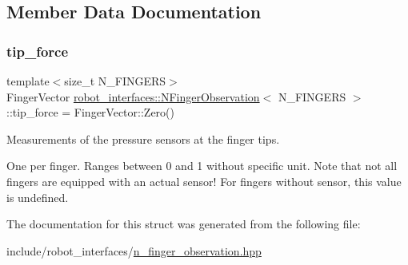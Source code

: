 \subsection{Member Data Documentation}
\mbox{\label{structrobot__interfaces_1_1NFingerObservation_a48ea78dfbc3e17a313a312d758d27343}} 
\subsubsection{\texorpdfstring{tip\+\_\+force}{tip\_force}}
{\footnotesize\ttfamily template$<$size\+\_\+t N\+\_\+\+F\+I\+N\+G\+E\+RS$>$ \\
Finger\+Vector \hyperlink{structrobot__interfaces_1_1NFingerObservation}{robot\+\_\+interfaces\+::\+N\+Finger\+Observation}$<$ N\+\_\+\+F\+I\+N\+G\+E\+RS $>$\+::tip\+\_\+force = Finger\+Vector\+::\+Zero()}



Measurements of the pressure sensors at the finger tips. 

One per finger. Ranges between 0 and 1 without specific unit. Note that not all fingers are equipped with an actual sensor! For fingers without sensor, this value is undefined. 

The documentation for this struct was generated from the following file\+:\begin{DoxyCompactItemize}
\item 
include/robot\+\_\+interfaces/\hyperlink{n__finger__observation_8hpp}{n\+\_\+finger\+\_\+observation.\+hpp}\end{DoxyCompactItemize}
